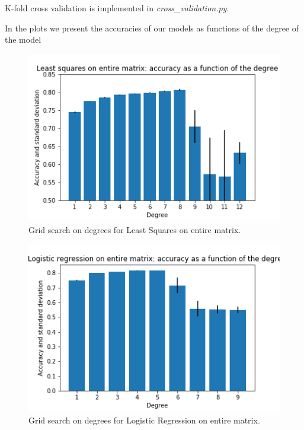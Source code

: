 \documentclass[10pt,conference,compsocconf]{IEEEtran}
\begin{document}
K-fold cross validation is implemented in \textit{cross\_validation.py}.

In the plots we present the accuracies of our models as functions of the degree of the model

\begin{figure}[tbp]
  \centering
  \includegraphics[width=\columnwidth]{ls_deg}
  \caption{Grid search on degrees for Least Squares on entire matrix.}
  \vspace{-3mm}
  \label{fig:denoise-fourier}
\end{figure}
\begin{figure}[tbp]
  \centering
  \includegraphics[width=\columnwidth]{lr_deg}
  \caption{Grid search on degrees for Logistic Regression on entire matrix.}
  \vspace{-3mm}
  \label{fig:denoise-fourier}
\end{figure}
\end{document}
